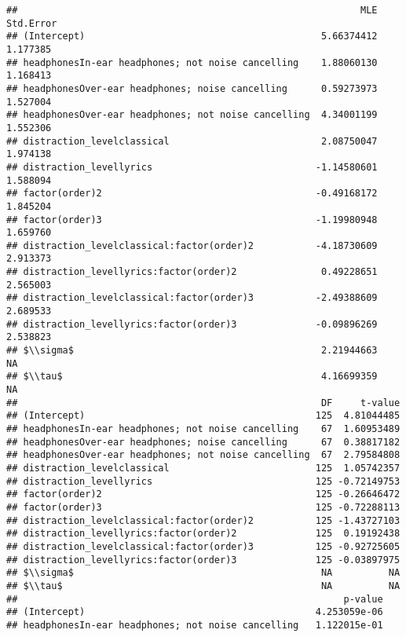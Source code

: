\documentclass[]{article}
\begin{document}
\begin{verbatim}
##                                                             MLE Std.Error
## (Intercept)                                          5.66374412  1.177385
## headphonesIn-ear headphones; not noise cancelling    1.88060130  1.168413
## headphonesOver-ear headphones; noise cancelling      0.59273973  1.527004
## headphonesOver-ear headphones; not noise cancelling  4.34001199  1.552306
## distraction_levelclassical                           2.08750047  1.974138
## distraction_levellyrics                             -1.14580601  1.588094
## factor(order)2                                      -0.49168172  1.845204
## factor(order)3                                      -1.19980948  1.659760
## distraction_levelclassical:factor(order)2           -4.18730609  2.913373
## distraction_levellyrics:factor(order)2               0.49228651  2.565003
## distraction_levelclassical:factor(order)3           -2.49388609  2.689533
## distraction_levellyrics:factor(order)3              -0.09896269  2.538823
## $\\sigma$                                            2.21944663        NA
## $\\tau$                                              4.16699359        NA
##                                                      DF     t-value
## (Intercept)                                         125  4.81044485
## headphonesIn-ear headphones; not noise cancelling    67  1.60953489
## headphonesOver-ear headphones; noise cancelling      67  0.38817182
## headphonesOver-ear headphones; not noise cancelling  67  2.79584808
## distraction_levelclassical                          125  1.05742357
## distraction_levellyrics                             125 -0.72149753
## factor(order)2                                      125 -0.26646472
## factor(order)3                                      125 -0.72288113
## distraction_levelclassical:factor(order)2           125 -1.43727103
## distraction_levellyrics:factor(order)2              125  0.19192438
## distraction_levelclassical:factor(order)3           125 -0.92725605
## distraction_levellyrics:factor(order)3              125 -0.03897975
## $\\sigma$                                            NA          NA
## $\\tau$                                              NA          NA
##                                                          p-value
## (Intercept)                                         4.253059e-06
## headphonesIn-ear headphones; not noise cancelling   1.122015e-01

\end{verbatim}
\end{document}
